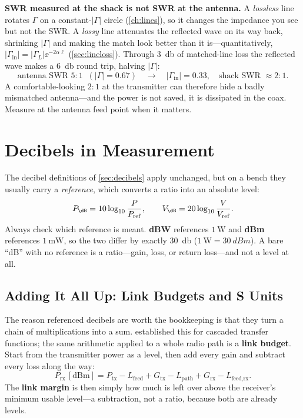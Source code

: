 \begin{mistakebox}
\textbf{SWR measured at the shack is not SWR at the antenna.} A \emph{lossless} line
rotates \(\Gamma\) on a constant-\(|\Gamma|\) circle (\cref{ch:lines}), so it changes
the impedance you see but not the SWR. A \emph{lossy} line attenuates the reflected
wave on its way back, shrinking \(|\Gamma|\) and making the match look better than it
is---quantitatively, \(|\Gamma_{\mathrm{in}}|=|\Gamma_L|\ee^{-2\alpha\ell}\)
(\cref{sec:lineloss}). Through \SI{3}{\decibel} of matched-line loss the reflected
wave makes a \SI{6}{\decibel} round trip, halving \(|\Gamma|\):
\[
\text{antenna SWR } 5\!:\!1 \;\;(|\Gamma|=0.67)
\quad\longrightarrow\quad
|\Gamma_{\mathrm{in}}|=0.33,
\quad
\text{shack SWR } \approx 2\!:\!1 .
\]
A comfortable-looking \(2\!:\!1\) at the transmitter can therefore hide a badly
mismatched antenna---and the power is not saved, it is dissipated in the coax. Measure
at the antenna feed point when it matters.
\end{mistakebox}

\section{Decibels in Measurement}
The decibel definitions of \cref{sec:decibels} apply unchanged, but on a bench they
usually carry a \emph{reference}, which converts a ratio into an absolute level:
\[
P_{\dB}=10\log_{10}\frac{P}{P_{\mathrm{ref}}},
\qquad
V_{\dB}=20\log_{10}\frac{V}{V_{\mathrm{ref}}}.
\]
Always check which reference is meant. \textbf{dBW} references \(\SI{1}{\watt}\) and
\textbf{dBm} references \(\SI{1}{\milli\watt}\), so the two differ by exactly
\SI{30}{\decibel} (\(\SI{1}{\watt}=\SI{30}{dBm}\)). A bare ``dB'' with no reference
is a ratio---gain, loss, or return loss---and not a level at all.

\subsection{Adding It All Up: Link Budgets and S Units}
The reason referenced decibels are worth the bookkeeping is that they turn a chain of
multiplications into a sum.  established this for cascaded
transfer functions; the same arithmetic applied to a whole radio path is a
\textbf{link budget}. Start from the transmitter power as a level, then add every gain
and subtract every loss along the way:
\[
P_{\text{rx}}\,[\mathrm{dBm}]
=P_{\text{tx}}-L_{\text{feed}}+G_{\text{tx}}
-L_{\text{path}}+G_{\text{rx}}-L_{\text{feed,rx}} .
\]
The \textbf{link margin} is then simply how much is left over above the receiver's
minimum usable level---a subtraction, not a ratio, because both are already levels.

